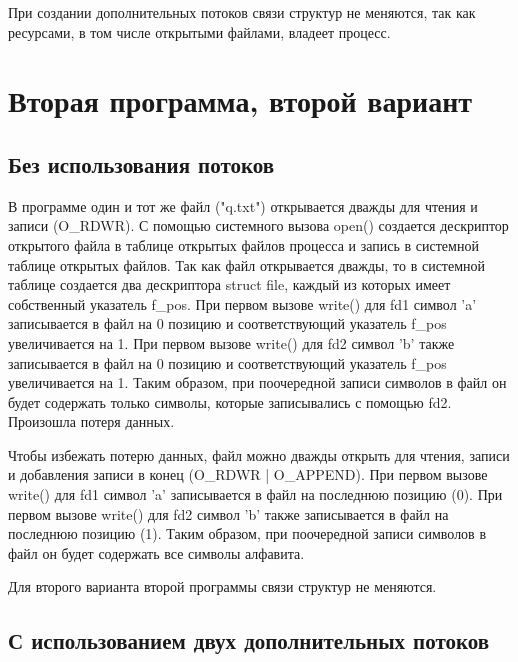 При создании дополнительных потоков связи структур не меняются, так как ресурсами, в том числе открытыми файлами, владеет процесс.

\clearpage

\section{Вторая программа, второй вариант}

\subsection{Без использования потоков}


\clearpage


В программе один и тот же файл ("q.txt") открывается дважды для чтения и записи (O\_RDWR).
С помощью системного вызова open() создается дескриптор открытого файла в таблице открытых файлов процесса и запись в системной таблице открытых файлов.
Так как файл открывается дважды, то в системной таблице создается два дескриптора struct file, каждый из которых имеет собственный указатель f\_pos.
При первом вызове write() для fd1 символ 'a' записывается в файл на 0 позицию и соответствующий указатель f\_pos увеличивается на 1.
При первом вызове write() для fd2 символ 'b' также записывается в файл на 0 позицию и соответствующий указатель f\_pos увеличивается на 1.
Таким образом, при поочередной записи символов в файл он будет содержать только символы, которые записывались с помощью fd2.
Произошла потеря данных.

Чтобы избежать потерю данных, файл можно дважды открыть для чтения, записи и добавления записи в конец (O\_RDWR | O\_APPEND).
При первом вызове write() для fd1 символ 'a' записывается в файл на последнюю позицию (0).
При первом вызове write() для fd2 символ 'b' также записывается в файл на последнюю позицию (1).
Таким образом, при поочередной записи символов в файл он будет содержать все символы алфавита.

Для второго варианта второй программы связи структур не меняются.

\clearpage

\subsection{С использованием двух дополнительных потоков}

